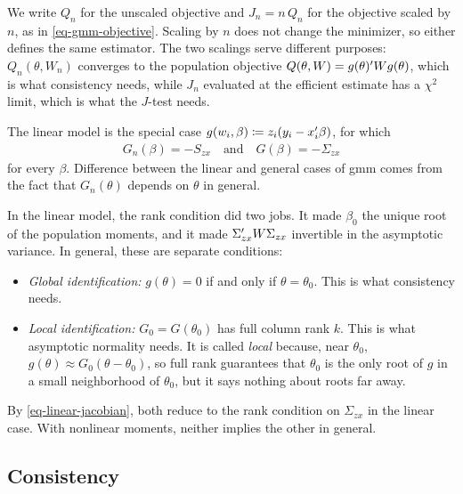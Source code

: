 \documentclass[a4paper,12pt]{article}
\begin{document}
\begin{remark}[$Q_n$ versus $J_n$]
	We write $Q_n$ for the unscaled objective and $J_n=n\,Q_n$ for the objective scaled by $n$, as in \eqref{eq-gmm-objective}.
	Scaling by $n$ does not change the minimizer, so either defines the same estimator.
	The two scalings serve different purposes:
	$Q_n(\theta,W_n)$ converges to the population objective $Q(\theta,W)=g(\theta)^{\prime} Wg(\theta)$, which is what consistency needs,
	while $J_n$ evaluated at the efficient estimate has a $\chi^2$ limit, which is what the $J$-test needs.
\end{remark}

\begin{remark}
	The linear model is the special case $g(w_i,\beta)\coloneqq z_i(y_i-x_i^{\prime}\beta)$, for which
	\begin{align}\label{eq-linear-jacobian}
		G_n(\beta)=-S_{zx}
		\quad\text{and}\quad
		G(\beta)=-\Sigma_{zx}
	\end{align}
	for every $\beta$.
	Difference between the linear and general cases of \gls{gmm} comes from the fact that
	$G_n(\theta)$ depends on $\theta$ in general.
\end{remark}

\begin{remark}[Identification]
	In the linear model, the rank condition did two jobs.
	It made $\beta_0$ the unique root of the population moments, and it made $\Sigma_{zx}^{\prime} W\Sigma_{zx}$ invertible in the asymptotic variance.
	In general, these are separate conditions:
	\begin{itemize}
		\item \emph{Global identification:} $g(\theta)=0$ if and only if $\theta=\theta_0$. This is what consistency needs.
		\item \emph{Local identification:} $G_0=G(\theta_0)$ has full column rank $k$. This is what asymptotic normality needs.
		It is called \emph{local} because, near $\theta_0$, $g(\theta)\approx G_0(\theta-\theta_0)$,
		so full rank guarantees that $\theta_0$ is the only root of $g$ in a small neighborhood of $\theta_0$,
		but it says nothing about roots far away.
	\end{itemize}
	By \eqref{eq-linear-jacobian}, both reduce to the rank condition on $\Sigma_{zx}$ in the linear case.
	With nonlinear moments, neither implies the other in general.
\end{remark}

\subsection{Consistency}
\end{document}
